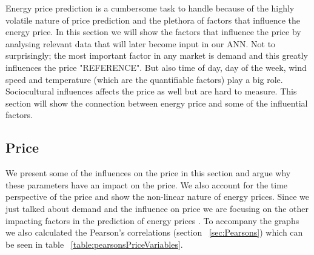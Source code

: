 Energy price prediction is a cumbersome task to handle because of the highly volatile nature of price prediction and the plethora of factors that influence the energy price. In this section we will show the factors that influence the price by analysing relevant data that will later become input in our ANN. Not to surprisingly; the most important factor in any market is demand and this greatly influences the price "REFERENCE". But also time of day, day of the week, wind speed and temperature (which are the quantifiable factors) play a big role. Sociocultural influences affects the price as well but are hard to measure. This section will show the connection between energy price and some of the influential factors.



\subsection{Price}\label{sec:Price}
We present some of the influences on the price in this section and argue why these parameters have an impact on the price. We also account for the time perspective of the price and show the non-linear nature of energy prices. Since we just talked about demand and the influence on price we are focusing on the other impacting factors in the prediction of energy prices . To accompany the graphs we also calculated the Pearson's correlations (section ~\ref{sec:Pearsons}) which can be seen in table ~\ref{table:pearsonsPriceVariables}.

